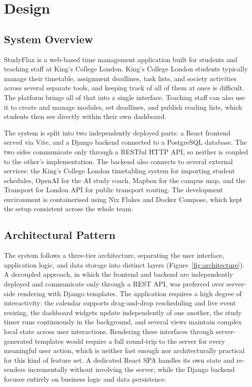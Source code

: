 \chapter{Design}
\label{chap:design}



\section{System Overview}

StudyFlax is a web-based time management application built for students and teaching staff at King's College London. King's College London students typically manage their timetable, assignment deadlines, task lists, and society activities across several separate tools, and keeping track of all of them at once is difficult. The platform brings all of that into a single interface. Teaching staff can also use it to create and manage modules, set deadlines, and publish reading lists, which students then see directly within their own dashboard.

The system is split into two independently deployed parts: a React frontend served via Vite, and a Django backend connected to a PostgreSQL database. The two sides communicate only through a RESTful HTTP API, so neither is coupled to the other's implementation. The backend also connects to several external services: the King's College London timetabling system for importing student schedules, OpenAI for the AI study coach, Mapbox for the campus map, and the Transport for London API for public transport routing. The development environment is containerised using Nix Flakes and Docker Compose, which kept the setup consistent across the whole team.

\section{Architectural Pattern}

The system follows a three-tier architecture, separating the user interface, application logic, and data storage into distinct layers (Figure~\ref{fig:architecture}). A decoupled approach, in which the frontend and backend are independently deployed and communicate only through a REST API, was preferred over server-side rendering with Django templates. The application requires a high degree of interactivity: the calendar supports drag-and-drop rescheduling and live event resizing, the dashboard widgets update independently of one another, the study timer runs continuously in the background, and several views maintain complex local state across user interactions. Rendering these interfaces through server-generated templates would require a full round-trip to the server for every meaningful user action, which is neither fast enough nor architecturally practical for this kind of feature set. A dedicated React SPA handles its own state and re-renders incrementally without involving the server, while the Django backend focuses entirely on business logic and data persistence.

